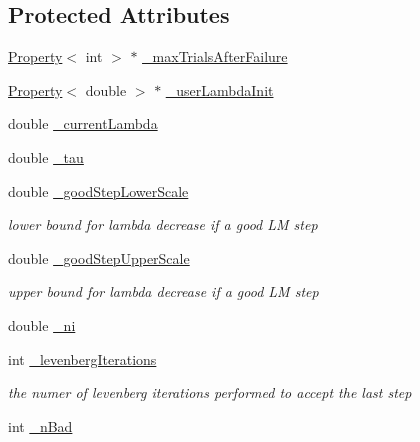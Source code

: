 \subsection*{Protected Attributes}
\begin{DoxyCompactItemize}
\item 
\mbox{\hyperlink{classg2o_1_1_property}{Property}}$<$ int $>$ $\ast$ \mbox{\hyperlink{classg2o_1_1_optimization_algorithm_levenberg_a1f3b03bbcb2dbeed686069bed8783b80}{\+\_\+max\+Trials\+After\+Failure}}
\item 
\mbox{\hyperlink{classg2o_1_1_property}{Property}}$<$ double $>$ $\ast$ \mbox{\hyperlink{classg2o_1_1_optimization_algorithm_levenberg_a021c97d3f8205ec2ae7fde147f98b452}{\+\_\+user\+Lambda\+Init}}
\item 
double \mbox{\hyperlink{classg2o_1_1_optimization_algorithm_levenberg_aec7bba815e20361aa7ccc4661f90a034}{\+\_\+current\+Lambda}}
\item 
double \mbox{\hyperlink{classg2o_1_1_optimization_algorithm_levenberg_ac09602f23e52c5dbc6be1bf77e9f9d5f}{\+\_\+tau}}
\item 
double \mbox{\hyperlink{classg2o_1_1_optimization_algorithm_levenberg_a4951bc2e2fcca2c4eae4864690a4c087}{\+\_\+good\+Step\+Lower\+Scale}}
\begin{DoxyCompactList}\small\item\em lower bound for lambda decrease if a good LM step \end{DoxyCompactList}\item 
double \mbox{\hyperlink{classg2o_1_1_optimization_algorithm_levenberg_a16d8b5540cd7ae0c132a565e3f49c021}{\+\_\+good\+Step\+Upper\+Scale}}
\begin{DoxyCompactList}\small\item\em upper bound for lambda decrease if a good LM step \end{DoxyCompactList}\item 
double \mbox{\hyperlink{classg2o_1_1_optimization_algorithm_levenberg_a8bcb1a957056cba788072992c5a8a7a1}{\+\_\+ni}}
\item 
int \mbox{\hyperlink{classg2o_1_1_optimization_algorithm_levenberg_a2319771c8d3ee0f773bdb86d5416bab7}{\+\_\+levenberg\+Iterations}}
\begin{DoxyCompactList}\small\item\em the numer of levenberg iterations performed to accept the last step \end{DoxyCompactList}\item 
int \mbox{\hyperlink{classg2o_1_1_optimization_algorithm_levenberg_a7f0b375c45a9f91f2676548591273c8d}{\+\_\+n\+Bad}}
\end{DoxyCompactItemize}


